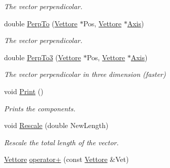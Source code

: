 \begin{DoxyCompactItemize}
\begin{DoxyCompactList}\small\item\em The vector perpendicolar. \end{DoxyCompactList}\item 
double \hyperlink{classVettore_ab1ccf9725311b3fdb06d382bbdfc1066}{Perp\+To} (\hyperlink{classVettore}{Vettore} $\ast$Pos, \hyperlink{classVettore}{Vettore} $\ast$\hyperlink{classVettore_a5a767accac3ff301f062fce739190bb8}{Axis})\hypertarget{classVettore_ab1ccf9725311b3fdb06d382bbdfc1066}{}\label{classVettore_ab1ccf9725311b3fdb06d382bbdfc1066}

\begin{DoxyCompactList}\small\item\em The vector perpendicolar. \end{DoxyCompactList}\item 
double \hyperlink{classVettore_a0d1417eacc715d326e65e21a7c6d50ec}{Perp\+To3} (\hyperlink{classVettore}{Vettore} $\ast$Pos, \hyperlink{classVettore}{Vettore} $\ast$\hyperlink{classVettore_a5a767accac3ff301f062fce739190bb8}{Axis})\hypertarget{classVettore_a0d1417eacc715d326e65e21a7c6d50ec}{}\label{classVettore_a0d1417eacc715d326e65e21a7c6d50ec}

\begin{DoxyCompactList}\small\item\em The vector perpendicolar in three dimension (faster) \end{DoxyCompactList}\item 
void \hyperlink{classVettore_a9dcac18006ce057b8d78c847174c1362}{Print} ()\hypertarget{classVettore_a9dcac18006ce057b8d78c847174c1362}{}\label{classVettore_a9dcac18006ce057b8d78c847174c1362}

\begin{DoxyCompactList}\small\item\em Prints the components. \end{DoxyCompactList}\item 
void \hyperlink{classVettore_a735ba6810472f29b5158d6f266371c9b}{Rescale} (double New\+Length)\hypertarget{classVettore_a735ba6810472f29b5158d6f266371c9b}{}\label{classVettore_a735ba6810472f29b5158d6f266371c9b}

\begin{DoxyCompactList}\small\item\em Rescale the total length of the vector. \end{DoxyCompactList}\item 
\hyperlink{classVettore}{Vettore} \hyperlink{classVettore_aa47e7ac4476114c127060e8ab4b0bd1c}{operator+} (const \hyperlink{classVettore}{Vettore} \&Vet)\hypertarget{classVettore_aa47e7ac4476114c127060e8ab4b0bd1c}{}\label{classVettore_aa47e7ac4476114c127060e8ab4b0bd1c}


\end{DoxyCompactItemize}
